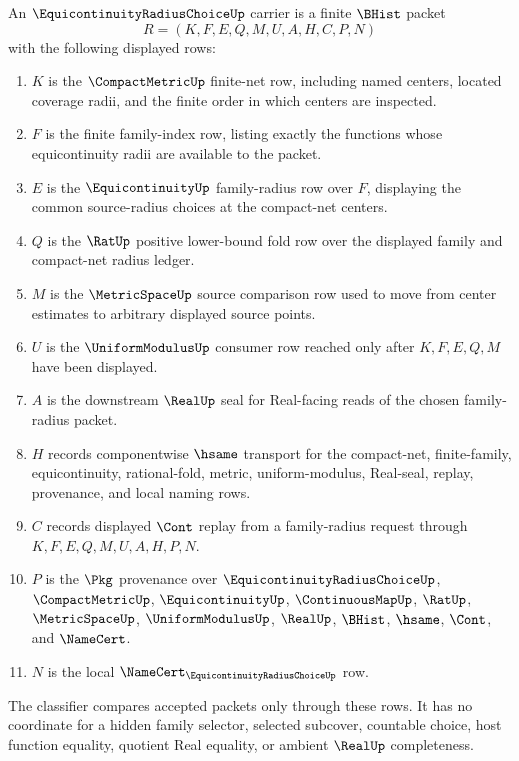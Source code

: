 \begin{definition}
\label{def:equicontinuity-radius-choice-carrier}
An $\EquicontinuityRadiusChoiceUp$ carrier is a finite $\BHist$ packet
$$
R=(K,F,E,Q,M,U,A,H,C,P,N)
$$
with the following displayed rows:
\begin{enumerate}
\item $K$ is the $\CompactMetricUp$ finite-net row, including named centers, located coverage radii, and the finite order in which centers are inspected.
\item $F$ is the finite family-index row, listing exactly the functions whose equicontinuity radii are available to the packet.
\item $E$ is the $\EquicontinuityUp$ family-radius row over $F$, displaying the common source-radius choices at the compact-net centers.
\item $Q$ is the $\RatUp$ positive lower-bound fold row over the displayed family and compact-net radius ledger.
\item $M$ is the $\MetricSpaceUp$ source comparison row used to move from center estimates to arbitrary displayed source points.
\item $U$ is the $\UniformModulusUp$ consumer row reached only after $K,F,E,Q,M$ have been displayed.
\item $A$ is the downstream $\RealUp$ seal for Real-facing reads of the chosen family-radius packet.
\item $H$ records componentwise $\hsame$ transport for the compact-net, finite-family, equicontinuity, rational-fold, metric, uniform-modulus, Real-seal, replay, provenance, and local naming rows.
\item $C$ records displayed $\Cont$ replay from a family-radius request through $K,F,E,Q,M,U,A,H,P,N$.
\item $P$ is the $\Pkg$ provenance over $\EquicontinuityRadiusChoiceUp$, $\CompactMetricUp$, $\EquicontinuityUp$, $\ContinuousMapUp$, $\RatUp$, $\MetricSpaceUp$, $\UniformModulusUp$, $\RealUp$, $\BHist$, $\hsame$, $\Cont$, and $\NameCert$.
\item $N$ is the local $\NameCert_{\EquicontinuityRadiusChoiceUp}$ row.
\end{enumerate}
The classifier compares accepted packets only through these rows. It has no coordinate for a hidden family selector, selected subcover, countable choice, host function equality, quotient Real equality, or ambient $\RealUp$ completeness.
\end{definition}

